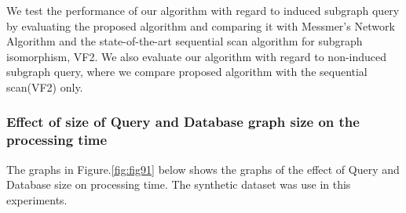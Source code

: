 
We test the performance of our algorithm with regard to induced subgraph query by evaluating the proposed algorithm and comparing it with Messmer's Network Algorithm and the state-of-the-art sequential scan algorithm for subgraph isomorphism, VF2\cite{cordella2001_vf2}.
We also evaluate our algorithm with regard to non-induced subgraph query, where we compare proposed algorithm with the sequential scan(VF2) only.


\subsubsection{Effect of size of Query and Database graph size on  the processing time}The graphs in Figure.\ref{fig:fig91} below shows the graphs of the effect of Query and Database size on processing time. The synthetic dataset was use in this experiments.  


